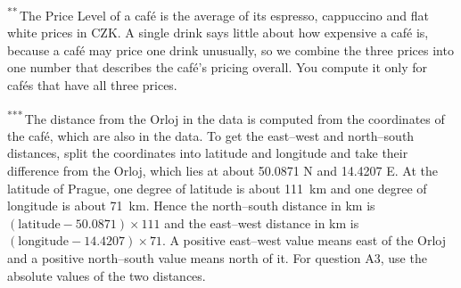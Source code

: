 \documentclass[11pt,a4paper]{article}
\begin{document}
\begin{landscape}
{\noindent\textsuperscript{**}\,The Price Level of a caf\'e is the average of its espresso, cappuccino and flat white prices in CZK. A single drink says little about how expensive a caf\'e is, because a caf\'e may price one drink unusually, so we combine the three prices into one number that describes the caf\'e's pricing overall. You compute it only for caf\'es that have all three prices.

\noindent\textsuperscript{***}\,The distance from the Orloj in the data is computed from the coordinates of the caf\'e, which are also in the data. To get the east--west and north--south distances, split the coordinates into latitude and longitude and take their difference from the Orloj, which lies at about 50.0871\textdegree{} N and 14.4207\textdegree{} E. At the latitude of Prague, one degree of latitude is about 111~km and one degree of longitude is about 71~km. Hence the north--south distance in km is $(\text{latitude}-50.0871)\times 111$ and the east--west distance in km is $(\text{longitude}-14.4207)\times 71$. A positive east--west value means east of the Orloj and a positive north--south value means north of it. For question A3, use the absolute values of the two distances.
}
\end{landscape}
\end{document}
